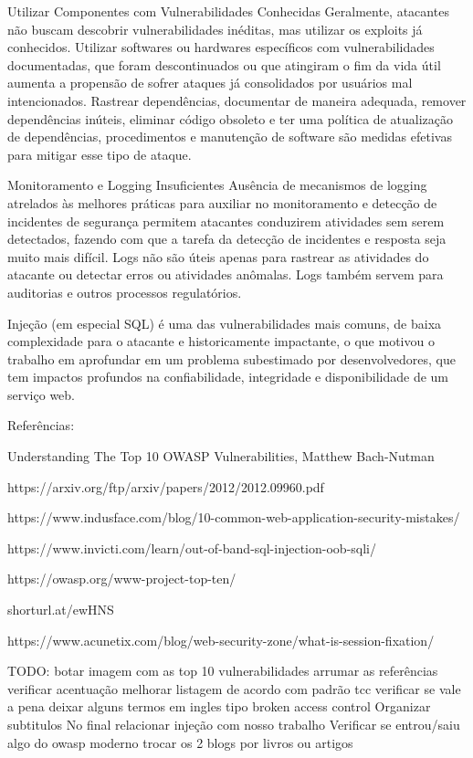 Utilizar Componentes com Vulnerabilidades Conhecidas
Geralmente, atacantes não buscam descobrir vulnerabilidades inéditas, mas utilizar os exploits já conhecidos.
Utilizar softwares ou hardwares específicos com vulnerabilidades documentadas, que foram descontinuados ou que atingiram o fim da vida útil aumenta a propensão de sofrer ataques já consolidados por usuários mal intencionados.
Rastrear dependências, documentar de maneira adequada, remover dependências inúteis, eliminar código obsoleto e ter uma política de atualização de dependências, procedimentos e manutenção de software são medidas efetivas para mitigar esse tipo de ataque.

Monitoramento e Logging Insuficientes
Ausência de mecanismos de logging atrelados às melhores práticas para auxiliar no monitoramento e detecção de incidentes de segurança permitem atacantes conduzirem atividades sem serem detectados, fazendo com que a tarefa da detecção de incidentes e resposta seja muito mais difícil. Logs não são úteis apenas para rastrear as atividades do atacante ou detectar erros ou atividades anômalas. Logs também servem para auditorias e outros processos regulatórios.

Injeção (em especial SQL) é uma das vulnerabilidades mais comuns, de baixa complexidade para o atacante e historicamente impactante, o que motivou o trabalho em aprofundar em um problema subestimado por desenvolvedores, que tem impactos profundos na confiabilidade, integridade e disponibilidade de um serviço web.

Referências:

Understanding The Top 10 OWASP Vulnerabilities, Matthew Bach-Nutman

https://arxiv.org/ftp/arxiv/papers/2012/2012.09960.pdf

https://www.indusface.com/blog/10-common-web-application-security-mistakes/

https://www.invicti.com/learn/out-of-band-sql-injection-oob-sqli/

https://owasp.org/www-project-top-ten/

shorturl.at/ewHNS

https://www.acunetix.com/blog/web-security-zone/what-is-session-fixation/

TODO:
botar imagem com as top 10 vulnerabilidades
arrumar as referências
verificar acentuação
melhorar listagem de acordo com padrão tcc
verificar se vale a pena deixar alguns termos em ingles tipo broken access control
Organizar subtitulos
No final relacionar injeção com nosso trabalho
Verificar se entrou/saiu algo do owasp moderno
trocar os 2 blogs por livros ou artigos


